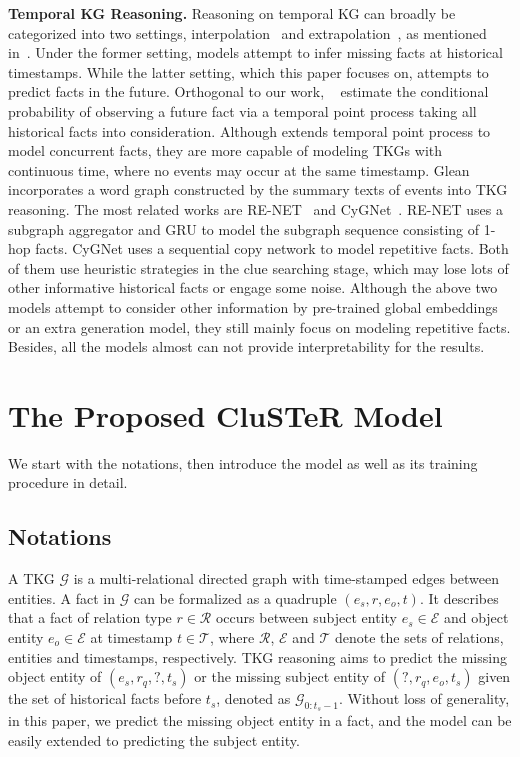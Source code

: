 \documentclass[11pt,a4paper]{article}
\begin{document}
{\bf Temporal KG Reasoning.} Reasoning on temporal KG can broadly be categorized
into two settings, interpolation~\cite{sadeghian2016temporal,
garcia2018learning, leblay2018deriving, dasgupta2018hyte,wu2019efficiently,
xu2020temporal, goel2020diachronic, wu2020temp, han2020dyernie, jung2020t} and
extrapolation~\cite{trivedi2017know, trivedi2018dyrep,han2020graph,
deng2020dynamic, jin2019recurrent,jin2020Renet, zhu2020learning,li2021temporal}, as mentioned
in~\citet{jin2020Renet}. Under the former setting, models attempt to infer
missing facts at historical timestamps.  While the latter setting, which this
paper focuses on, attempts to predict facts in the future. Orthogonal to our
work, ~\citet{trivedi2017know, trivedi2018dyrep} estimate the conditional
probability of observing a future fact via a temporal point process taking all
historical facts into consideration. Although \citet{han2020graph} extends
temporal point process to model concurrent facts, they are more capable of
modeling TKGs with continuous time, where no events may occur at the same
timestamp. Glean~\cite{deng2020dynamic} incorporates a word graph constructed by
the summary texts of events into TKG reasoning. The most related works are
RE-NET~\cite{jin2020Renet} and CyGNet~\cite{zhu2020learning}. RE-NET uses a
subgraph aggregator and GRU to model the subgraph sequence consisting of 1-hop facts. CyGNet uses a sequential copy network to model
repetitive facts. Both of them use heuristic strategies in the clue searching
stage, which may lose lots of other informative historical facts or engage some
noise. Although the above two models attempt to consider other information by
pre-trained global embeddings or an extra generation model, they still mainly
focus on modeling repetitive facts. Besides, all the models almost can not provide
interpretability for the results.

\section{The Proposed CluSTeR Model}
We start with the notations, then introduce the model as
well as its training procedure in detail.

\subsection{Notations}\label{notations}
A TKG $\mathcal{G}$ is a multi-relational directed graph with time-stamped edges
between entities. A fact in $\mathcal{G}$ can be formalized as a quadruple $(e_s, r, e_o,
t)$. It describes that a fact of relation type $r \in \mathcal{R}$ occurs
between subject entity $e_s \in \mathcal{E}$ and object entity $e_o \in
\mathcal{E}$ at timestamp $t \in \mathcal{T}$, where $\mathcal{R}$,
$\mathcal{E}$ and $\mathcal{T}$ denote the sets of relations, entities and
timestamps, respectively. TKG reasoning aims to predict the missing object
entity of $(e_{s}, r_{q}, ?, t_{s})$ or the missing subject entity of $(?,
r_{q}, e_{o}, t_{s})$ given the set of historical facts before $t_{s}$, denoted
as $\mathcal{G}_{0:t_{s}-1}$. Without loss of generality, in this paper, 
we predict the missing object entity in a fact, and the model can be easily
extended to predicting the subject entity. 
\end{document}
